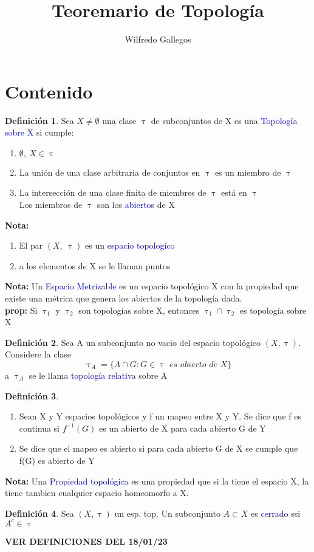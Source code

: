 \documentclass{article}
\title{Teoremario de Topología}
\author{Wilfredo Gallegos}
\theoremstyle{definition}
\newtheorem{definition}{Definición}[section]
\begin{document}
\maketitle

\section{Contenido}
\begin{definition}
 	Sea $X\neq \emptyset$ una clase $\uptau$ de	subconjuntos de X es una \textcolor{blue}{Topología sobre X} si cumple:
 	\begin{enumerate}
 	\item $\emptyset,\ X\in \uptau$
 	\item  La unión de una clase arbitraria de conjuntos en $\uptau$ es un miembro de $\uptau$
 	\item La intersección de una clase finita de miembres de $\uptau$ está en $\uptau$\\
 	Los miembros de $\uptau$ son los \textcolor{blue}{abiertos} de X 
	\end{enumerate}
\end{definition}
\textbf{Nota: } 
\begin{enumerate}
	\item El par $(X,\ \uptau)$ es un \textcolor{blue}{espacio topologíco} 
	\item a los elementos de X se le llaman puntos
\end{enumerate}
\textbf{Nota: }
Un \textcolor{blue}{Espacio Metrizable} es un espacio topológico X con la propiedad que existe una métrica que genera los abiertos de la topología dada.\\

\textbf{prop: }
Si $\uptau_1$ y $\uptau_2$ son topologías sobre X, entonces $\uptau_1\cap\uptau_2$ es topología sobre X
\begin{definition}
	Sea A un subconjunto no vacio del espacio topológico $(X, \uptau)$. Considere la clase 
	\[\uptau_A=\{A\cap G: G\in\uptau \textit{ es abierto de X}\}\]
	a $\uptau_A$ se le llama \textcolor{blue}{topología relativa} sobre A
\end{definition}
\begin{definition}
\hfill
	\begin{enumerate}
		\item Sean X y Y espacios topológicos y f un mapeo entre X y Y. Se dice que f es continua si $f^{-1}(G)$ es un abierto de X para cada abierto G de Y
		\item Se dice que el mapeo es abierto si para cada abierto G de X se cumple que f(G) es abierto de Y
	\end{enumerate}
\end{definition}
\textbf{Nota: } 
Una \textcolor{blue}{Propiedad topológica} es una propiedad que si la tiene el espacio X, la tiene tambien cualquier espacio homeomorfo a X.
\begin{definition}
	Sea $(X,\uptau)$ un esp. top. Un subconjunto $A\subset X$ es \textcolor{blue}{cerrado} ssi $A^c\in\uptau$
\end{definition}
\textbf{VER DEFINICIONES DEL 18/01/23}\\
\end{document}
